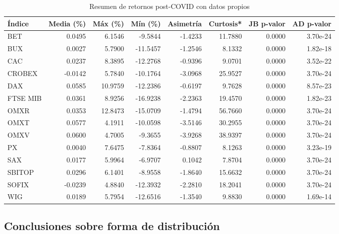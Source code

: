 \documentclass[12pt]{article}
\begin{document}
\begin{table}[H]
\centering
\small
\caption{Resumen de retornos post-COVID con datos propios}
\begin{tabular}{|l|r|r|r|r|r|r|r|}
\hline
\textbf{Índice} & \textbf{Media (\%)} & \textbf{Máx (\%)} & \textbf{Mín (\%)} & \textbf{Asimetría} & \textbf{Curtosis*} & \textbf{JB p-valor} & \textbf{AD p-valor} \\
\hline
BET     & 0.0495  & 6.1546  & -9.5844  & -1.4233 & 11.7880 & 0.0000     & 3.70e-24 \\
BUX     & 0.0027  & 5.7900  & -11.5457 & -1.2546 & 8.1332  & 0.0000     & 1.82e-18 \\
CAC     & 0.0237  & 8.3895  & -12.2768 & -0.9396 & 9.0701  & 0.0000     & 3.52e-22 \\
CROBEX  & -0.0142 & 5.7840  & -10.1764 & -3.0968 & 25.9527 & 0.0000     & 3.70e-24 \\
DAX     & 0.0585  & 10.9759 & -12.2386 & -0.6197 & 9.7628  & 0.0000     & 8.57e-23 \\
FTSE MIB& 0.0361  & 8.9256  & -16.9238 & -2.2363 & 19.4570 & 0.0000     & 1.82e-23 \\
OMXR    & 0.0353  & 12.8473 & -15.0709 & -1.4794 & 56.7660 & 0.0000     & 3.70e-24 \\
OMXT    & 0.0577  & 4.1911  & -10.0598 & -3.5146 & 30.2955 & 0.0000     & 3.70e-24 \\
OMXV    & 0.0600  & 4.7005  & -9.3655  & -3.9268 & 38.9397 & 0.0000     & 3.70e-24 \\
PX      & 0.0040  & 7.6475  & -7.8364  & -0.8807 & 8.1263  & 0.0000     & 3.23e-19 \\
SAX     & 0.0177  & 5.9964  & -6.9707  & 0.1042  & 7.8704  & 0.0000     & 3.70e-24 \\
SBITOP  & 0.0296  & 6.1401  & -8.9558  & -1.8640 & 15.6632 & 0.0000     & 3.70e-24 \\
SOFIX   & -0.0239 & 4.8840  & -12.3932 & -2.2810 & 18.2041 & 0.0000     & 3.70e-24 \\
WIG     & 0.0189  & 5.7954  & -12.6516 & -1.3540 & 9.8830  & 0.0000     & 1.69e-14 \\
\hline
\end{tabular}
\end{table}

 \subsection{Conclusiones sobre forma de distribución}
\end{document}
